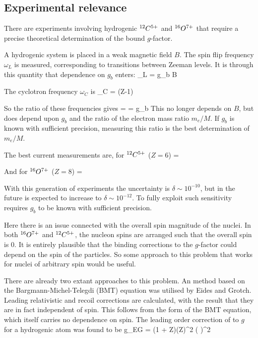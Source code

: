 \subsection{Experimental relevance}
There are experiments involving hydrogenic $^{12}C^{5+}$ and $^{16}O^{7+}$ that require a precise theoretical determination of the bound $g$-factor.


A hydrogenic system is placed in a weak magnetic field $B$.  The spin flip frequency $\omega_L$ is measured, corresponding to transitions between Zeeman levels.  It is through this quantity that dependence on $g_b$ enters:
\beq
	\omega_L = g_b  B
\eeq

The cyclotron frequency $\omega_C$ is
\beq
	\omega_C = (Z-1) 
\eeq

So the ratio of these frequencies gives
\beq
	 =  = 
	g_b  
\eeq
This no longer depends on $B$, but does depend upon $g_b$ and the ratio of the electron mass ratio $m_e/M$.  If $g_b$ is known with sufficient precision, measuring this ratio is the best determination of $m_e/M$.

The best current measurements are, for $^{12}C^{5+}$ ($Z=6$)
\beq
	  = ~~~~~
\eeq

And for $^{16}O^{7+}$ ($Z=8$)
\beq
		  = ~~~~~
\eeq

With this generation of experiments the uncertainty is $\delta \sim 10^{-10}$, but in the future is expected to increase to $\delta \sim 10^{-12}$.  To fully exploit such sensitivity requires $g_b$ to be known with sufficient precision.

Here there is an issue connected with the overall spin magnitude of the nuclei.  In both $^{16}O^{7+}$ and $^{12}C^{5+}$, the nucleon spins are arranged such that the overall spin is $0$.  It is entirely plausible that the binding corrections to the $g$-factor could depend on the spin of the particles.  So some approach to this problem that works for nuclei of arbitrary spin would be useful.

There are already two extant approaches to this problem.  An method based on the Bargmann-Michel-Telegdi (BMT) equation was utilised by Eides and Grotch.  Leading relativistic and recoil corrections are calculated, with the result that they are in fact independent of spin.  This follows from the form of the BMT equation, which itself carries no dependence on spin.  The leading order correction of to $g$ for a hydrogenic atom was found to be
\beq
	\Delta g_{EG} = (1 + Z)(Z\alpha)^2 \left(  \right )^2
\eeq 

